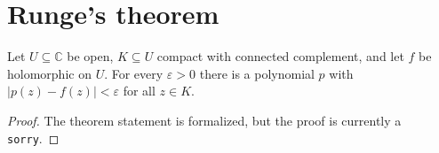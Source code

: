 \section{Runge's theorem}

\begin{theorem}
\label{thm:runge}
\notready
Let $U\subseteq\mathbb C$ be open, $K\subseteq U$ compact with connected complement, and let $f$ be holomorphic on $U$. For every $\varepsilon>0$ there is a polynomial $p$ with $|p(z)-f(z)|<\varepsilon$ for all $z\in K$.
\end{theorem}

\begin{proof}
The theorem statement is formalized, but the proof is currently a \texttt{sorry}.
\end{proof}
